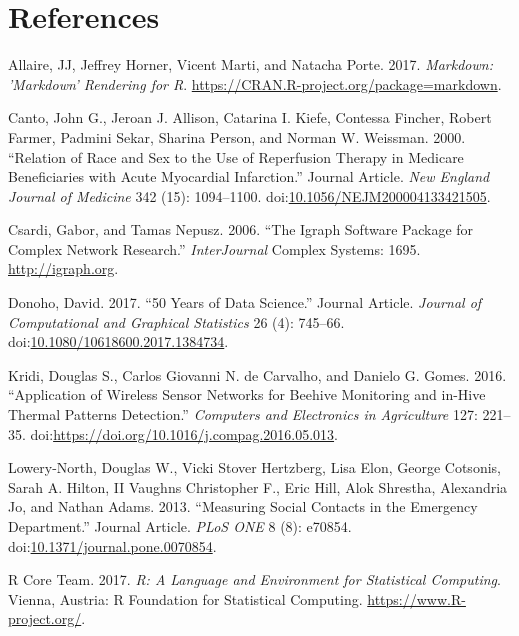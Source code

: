 \documentclass[]{elsarticle} %
\begin{document}
\section*{References}\label{references.unnumbered}

\hypertarget{refs}{}
\hypertarget{ref-MARKDOWN}{}
Allaire, JJ, Jeffrey Horner, Vicent Marti, and Natacha Porte. 2017.
\emph{Markdown: 'Markdown' Rendering for R}.
\url{https://CRAN.R-project.org/package=markdown}.

\hypertarget{ref-RN602}{}
Canto, John G., Jeroan J. Allison, Catarina I. Kiefe, Contessa Fincher,
Robert Farmer, Padmini Sekar, Sharina Person, and Norman W. Weissman.
2000. ``Relation of Race and Sex to the Use of Reperfusion Therapy in
Medicare Beneficiaries with Acute Myocardial Infarction.'' Journal
Article. \emph{New England Journal of Medicine} 342 (15): 1094--1100.
doi:\href{https://doi.org/10.1056/NEJM200004133421505}{10.1056/NEJM200004133421505}.

\hypertarget{ref-IGRAPH}{}
Csardi, Gabor, and Tamas Nepusz. 2006. ``The Igraph Software Package for
Complex Network Research.'' \emph{InterJournal} Complex Systems: 1695.
\url{http://igraph.org}.

\hypertarget{ref-RN794}{}
Donoho, David. 2017. ``50 Years of Data Science.'' Journal Article.
\emph{Journal of Computational and Graphical Statistics} 26 (4):
745--66.
doi:\href{https://doi.org/10.1080/10618600.2017.1384734}{10.1080/10618600.2017.1384734}.

\hypertarget{ref-BEES}{}
Kridi, Douglas S., Carlos Giovanni N. de Carvalho, and Danielo G. Gomes.
2016. ``Application of Wireless Sensor Networks for Beehive Monitoring
and in-Hive Thermal Patterns Detection.'' \emph{Computers and
Electronics in Agriculture} 127: 221--35.
doi:\href{https://doi.org/https://doi.org/10.1016/j.compag.2016.05.013}{https://doi.org/10.1016/j.compag.2016.05.013}.

\hypertarget{ref-RN1X}{}
Lowery-North, Douglas W., Vicki Stover Hertzberg, Lisa Elon, George
Cotsonis, Sarah A. Hilton, II Vaughns Christopher F., Eric Hill, Alok
Shrestha, Alexandria Jo, and Nathan Adams. 2013. ``Measuring Social
Contacts in the Emergency Department.'' Journal Article. \emph{PLoS ONE}
8 (8): e70854.
doi:\href{https://doi.org/10.1371/journal.pone.0070854}{10.1371/journal.pone.0070854}.

\hypertarget{ref-CRAN}{}
R Core Team. 2017. \emph{R: A Language and Environment for Statistical
Computing}. Vienna, Austria: R Foundation for Statistical Computing.
\url{https://www.R-project.org/}.
\end{document}
